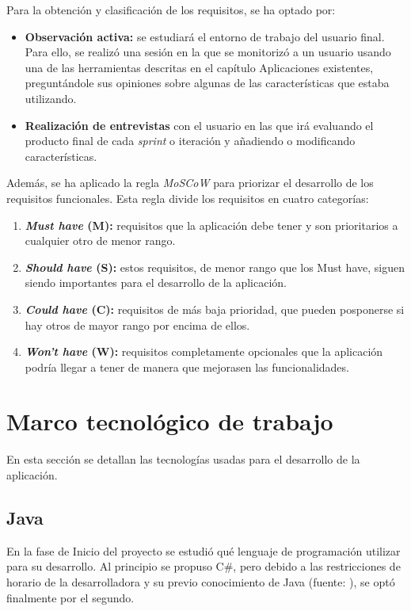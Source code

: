 Para la obtención y clasificación de los requisitos, se ha optado por:
\begin{itemize}
	\item \textbf{Observación activa:} se estudiará el entorno de trabajo del usuario final. Para ello, se realizó una sesión en la que se monitorizó a un usuario usando una de las herramientas descritas en el capítulo Aplicaciones existentes, preguntándole sus opiniones sobre algunas de las características que estaba utilizando.
	\item \textbf{Realización de entrevistas} con el usuario en las que irá evaluando el producto final de cada \textit{sprint} o iteración y añadiendo o modificando características.
\end{itemize}

Además, se ha aplicado la regla \textit{MoSCoW} para priorizar el desarrollo de los requisitos funcionales. Esta regla divide los requisitos en cuatro categorías:
\begin{enumerate}
	\item \textbf{\textit{Must have} (M):} requisitos que la aplicación debe tener y son prioritarios a cualquier otro de menor rango.	
	\item \textbf{\textit{Should have} (S):} estos requisitos, de menor rango que los Must have, siguen siendo importantes para el desarrollo de la aplicación.	
	\item \textbf{\textit{Could have} (C):} requisitos de más baja prioridad, que pueden posponerse si hay otros de mayor rango por encima de ellos.	
	\item \textbf{\textit{Won't have} (W):} requisitos completamente opcionales que la aplicación podría llegar a tener de manera que mejorasen las funcionalidades.
	
\end{enumerate}



\section{Marco tecnológico de trabajo}

En esta sección se detallan las tecnologías usadas para el desarrollo de la aplicación.

\subsection{Java}
En la fase de Inicio del proyecto se estudió qué lenguaje de programación utilizar para su desarrollo. Al principio se propuso C\#, pero debido a las restricciones de horario de la desarrolladora y su previo conocimiento de Java (fuente: \cite{java}), se optó finalmente por el segundo.

